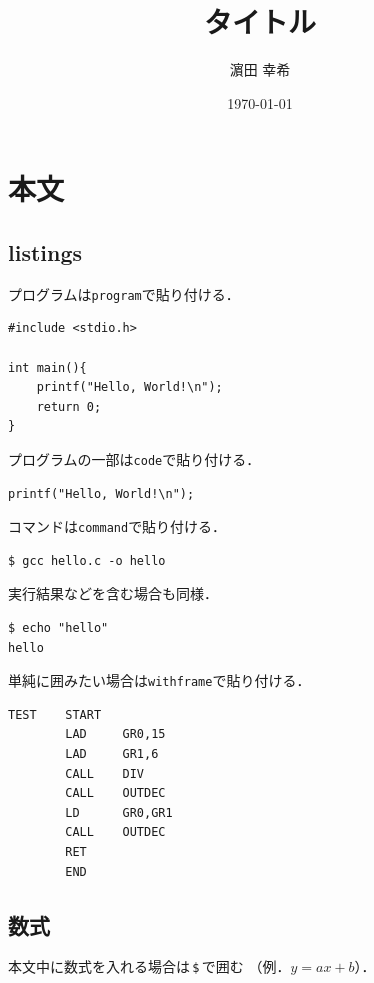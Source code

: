 \documentclass[uplatex]{jsarticle}
\begin{document}
\title{タイトル}
\author{濵田 幸希}
\date{\today}
\maketitle
\tableofcontents

\newpage
\section{本文}
\subsection{listings}
プログラムは\verb|program|で貼り付ける．

\begin{lstlisting}[style=program,caption=hello.c]
#include <stdio.h>

int main(){
    printf("Hello, World!\n");
    return 0;
}
\end{lstlisting}
\vspace{10pt}

プログラムの一部は\verb|code|で貼り付ける．

\vspace{5pt}
\begin{lstlisting}[style=code]
printf("Hello, World!\n");
\end{lstlisting}

コマンドは\verb|command|で貼り付ける．

\vspace{5pt}
\begin{lstlisting}[style=command]
$ gcc hello.c -o hello
\end{lstlisting}

実行結果などを含む場合も同様．

\vspace{5pt}
\begin{lstlisting}[style=command]
$ echo "hello"
hello
\end{lstlisting}

単純に囲みたい場合は\verb|withframe|で貼り付ける．

\vspace{5pt}
\begin{lstlisting}[style=withframe]
TEST    START
        LAD     GR0,15
        LAD     GR1,6
        CALL    DIV
        CALL    OUTDEC
        LD      GR0,GR1
        CALL    OUTDEC
        RET
        END
\end{lstlisting}

\newpage
\subsection{数式}
本文中に数式を入れる場合は\,\verb|$|\,で囲む
（例．$y=ax+b$）．
\end{document}
